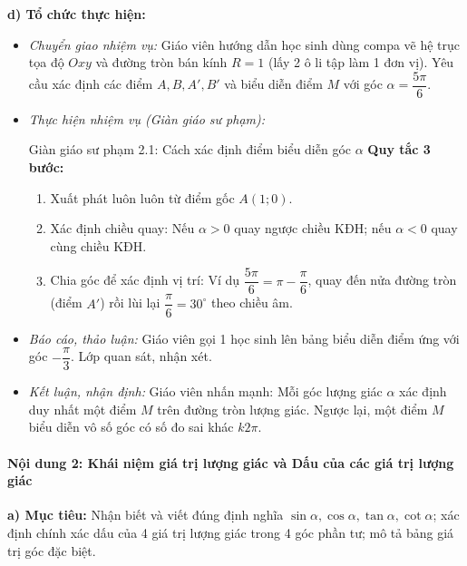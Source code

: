 \documentclass[12pt, a4paper]{article}
\begin{document}
\textbf{d) Tổ chức thực hiện:}
\begin{itemize}[leftmargin=0.6cm]
    \item \textit{Chuyển giao nhiệm vụ:} Giáo viên hướng dẫn học sinh dùng compa vẽ hệ trục tọa độ $Oxy$ và đường tròn bán kính $R = 1$ (lấy 2 ô li tập làm 1 đơn vị). Yêu cầu xác định các điểm $A, B, A', B'$ và biểu diễn điểm $M$ với góc $\alpha = \dfrac{5\pi}{6}$.
    \item \textit{Thực hiện nhiệm vụ (Giàn giáo sư phạm):}
    \begin{scaffoldbox}{Giàn giáo sư phạm 2.1: Cách xác định điểm biểu diễn góc $\alpha$}
        \textbf{Quy tắc 3 bước:}
        \begin{enumerate}[leftmargin=0.5cm]
            \item Xuất phát luôn luôn từ điểm gốc $A(1; 0)$.
            \item Xác định chiều quay: Nếu $\alpha > 0$ quay ngược chiều KĐH; nếu $\alpha < 0$ quay cùng chiều KĐH.
            \item Chia góc để xác định vị trí: Ví dụ $\dfrac{5\pi}{6} = \pi - \dfrac{\pi}{6}$, quay đến nửa đường tròn (điểm $A'$) rồi lùi lại $\dfrac{\pi}{6} = 30^\circ$ theo chiều âm.
        \end{enumerate}
    \end{scaffoldbox}
    \item \textit{Báo cáo, thảo luận:} Giáo viên gọi 1 học sinh lên bảng biểu diễn điểm ứng với góc $-\dfrac{\pi}{3}$. Lớp quan sát, nhận xét.
    \item \textit{Kết luận, nhận định:} Giáo viên nhấn mạnh: Mỗi góc lượng giác $\alpha$ xác định duy nhất một điểm $M$ trên đường tròn lượng giác. Ngược lại, một điểm $M$ biểu diễn vô số góc có số đo sai khác $k2\pi$.
\end{itemize}

\paragraph{Nội dung 2: Khái niệm giá trị lượng giác và Dấu của các giá trị lượng giác}
\textbf{a) Mục tiêu:} Nhận biết và viết đúng định nghĩa $\sin\alpha, \cos\alpha, \tan\alpha, \cot\alpha$; xác định chính xác dấu của 4 giá trị lượng giác trong 4 góc phần tư; mô tả bảng giá trị góc đặc biệt.
\end{document}
